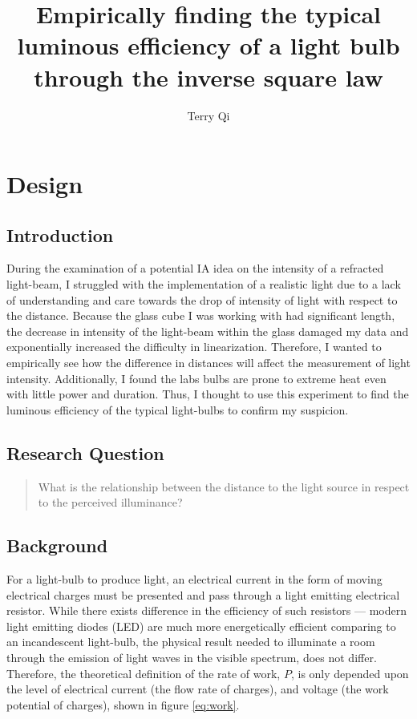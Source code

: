 \documentclass[a4paper,12pt]{article}
\title{Empirically finding the typical luminous efficiency of a light bulb through the inverse square law}
\author{Terry Qi}
\begin{document}
\maketitle

\section{Design}

\subsection{Introduction}
During the examination of a potential IA idea on the intensity of a refracted light-beam, I struggled with the implementation of a realistic light due to a lack of understanding and care towards the drop of intensity of light with respect to the distance. Because the glass cube I was working with had significant length, the decrease in intensity of the light-beam within the glass damaged my data and exponentially increased the difficulty in linearization. Therefore, I wanted to empirically see how the difference in distances will affect the measurement of light intensity. Additionally, I found the labs bulbs are prone to extreme heat even with little power and duration. Thus, I thought to use this experiment to find the luminous efficiency of the typical light-bulbs to confirm my suspicion.

\subsection{Research Question}
\begin{quote}
 What is the relationship between the distance to the light source in respect to the perceived illuminance?
\end{quote}

\subsection{Background}

For a light-bulb to produce light, an electrical current in the form of moving electrical charges must be presented and pass through a light emitting electrical resistor. While there exists difference in the efficiency of such resistors --- modern light emitting diodes (LED) are much more energetically efficient comparing to an incandescent light-bulb, the physical result needed to illuminate a room through the emission of light waves in the visible spectrum, does not differ. Therefore, the theoretical definition of the rate of work, $P$, is only depended upon the level of electrical current (the flow rate of charges), and voltage (the work potential of charges), shown in figure \ref{eq:work}.
\end{document}

